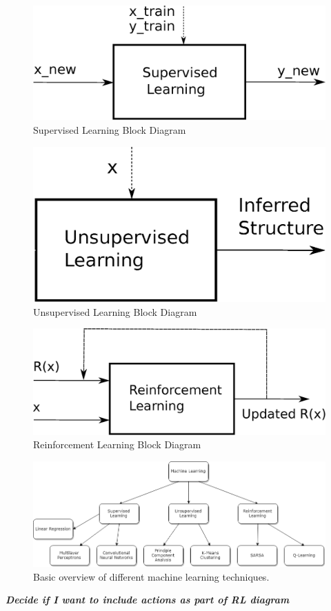 	\begin{figure}[ht]
		\centering
		\includegraphics[scale=0.4]{figures/supervisedLearningBlock.eps}
		\caption{Supervised Learning Block Diagram}
	\end{figure}
	\begin{figure}[ht]
		\centering
		\includegraphics[scale=0.4]{figures/unsupervisedLearningBlock.eps}
		\caption{Unsupervised Learning Block Diagram}
	\end{figure}
	\begin{figure}[ht]
	\centering
	\includegraphics[scale=0.4]{figures/reinforcementLearningBlock.eps}
	\caption{Reinforcement Learning Block Diagram}
	\end{figure}
	\begin{figure}[ht]
		\centering
		\caption{Basic overview of different machine learning techniques.}
		\includegraphics[scale=0.5]{figures/MLdiagram.png}
	\end{figure}
	\par \textbf{\textit{Decide if I want to include actions as part of RL diagram}}
	
